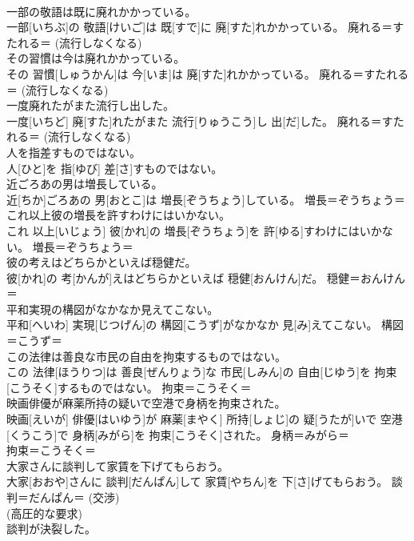 \documentclass[8pt]{extreport}
\begin{document}
\begin{CJK}{UTF8}{min}
{\\	一部の敬語は既に廃れかかっている。	
\\	一部[いちぶ]の 敬語[けいご]は 既[すで]に 廃[すた]れかかっている。	廃れる＝すたれる＝ (流行しなくなる) 
\\	その習慣は今は廃れかかっている。	
\\	その 習慣[しゅうかん]は 今[いま]は 廃[すた]れかかっている。	廃れる＝すたれる＝ (流行しなくなる) 
\\	一度廃れたがまた流行し出した。	
\\	一度[いちど] 廃[すた]れたがまた 流行[りゅうこう]し 出[だ]した。	廃れる＝すたれる＝ (流行しなくなる) 
\\	人を指差すものではない。	
\\	人[ひと]を 指[ゆび] 差[さ]すものではない。	
\\	近ごろあの男は増長している。	
\\	近[ちか]ごろあの 男[おとこ]は 増長[ぞうちょう]している。	増長＝ぞうちょう＝ 
\\	これ以上彼の増長を許すわけにはいかない。	
\\	これ 以上[いじょう] 彼[かれ]の 増長[ぞうちょう]を 許[ゆる]すわけにはいかない。	増長＝ぞうちょう＝ 
\\	彼の考えはどちらかといえば穏健だ。	
\\	彼[かれ]の 考[かんが]えはどちらかといえば 穏健[おんけん]だ。	穏健＝おんけん＝ 
\\	平和実現の構図がなかなか見えてこない。	
\\	平和[へいわ] 実現[じつげん]の 構図[こうず]がなかなか 見[み]えてこない。	構図＝こうず＝ 
\\	この法律は善良な市民の自由を拘束するものではない。	
\\	この 法律[ほうりつ]は 善良[ぜんりょう]な 市民[しみん]の 自由[じゆう]を 拘束[こうそく]するものではない。	拘束＝こうそく＝ 
\\	映画俳優が麻薬所持の疑いで空港で身柄を拘束された。	
\\	映画[えいが] 俳優[はいゆう]が 麻薬[まやく] 所持[しょじ]の 疑[うたが]いで 空港[くうこう]で 身柄[みがら]を 拘束[こうそく]された。	身柄＝みがら＝ 
\\	拘束＝こうそく＝ 
\\	大家さんに談判して家賃を下げてもらおう。	
\\	大家[おおや]さんに 談判[だんぱん]して 家賃[やちん]を 下[さ]げてもらおう。	談判＝だんぱん＝ (交渉) 
\\	(高圧的な要求) 
\\	談判が決裂した。	
}
\end{CJK}
\end{document}
